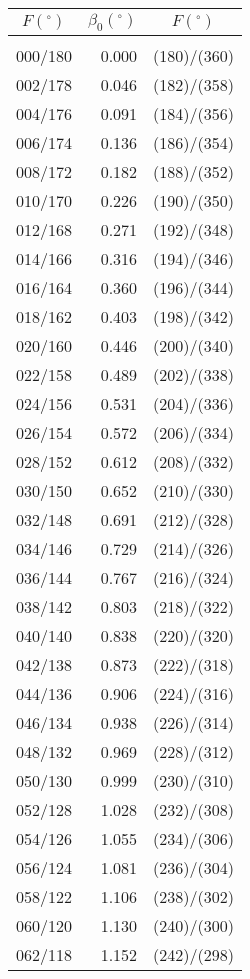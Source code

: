 \newpage
\begin{table}\centering
\small{ \begin{tabular}{crc}
$F (^\circ)$ & $\beta_0(^\circ)$ &
$F (^\circ)$ \\\hline
&&\\[-1.75ex]
000/180 &  0.000 & (180)/(360)\\
002/178 &  0.046 & (182)/(358)\\
004/176 &  0.091 & (184)/(356)\\
006/174 &  0.136 & (186)/(354)\\
008/172 &  0.182 & (188)/(352)\\
010/170 &  0.226 & (190)/(350)\\
012/168 &  0.271 & (192)/(348)\\
014/166 &  0.316 & (194)/(346)\\
016/164 &  0.360 & (196)/(344)\\
018/162 &  0.403 & (198)/(342)\\
020/160 &  0.446 & (200)/(340)\\
022/158 &  0.489 & (202)/(338)\\
024/156 &  0.531 & (204)/(336)\\
026/154 &  0.572 & (206)/(334)\\
028/152 &  0.612 & (208)/(332)\\
030/150 &  0.652 & (210)/(330)\\
032/148 &  0.691 & (212)/(328)\\
034/146 &  0.729 & (214)/(326)\\
036/144 &  0.767 & (216)/(324)\\
038/142 &  0.803 & (218)/(322)\\
040/140 &  0.838 & (220)/(320)\\
042/138 &  0.873 & (222)/(318)\\
044/136 &  0.906 & (224)/(316)\\
046/134 &  0.938 & (226)/(314)\\
048/132 &  0.969 & (228)/(312)\\
050/130 &  0.999 & (230)/(310)\\
052/128 &  1.028 & (232)/(308)\\
054/126 &  1.055 & (234)/(306)\\
056/124 &  1.081 & (236)/(304)\\
058/122 &  1.106 & (238)/(302)\\
060/120 &  1.130 & (240)/(300)\\
062/118 &  1.152 & (242)/(298)\\

\end{tabular}}
\end{table}
